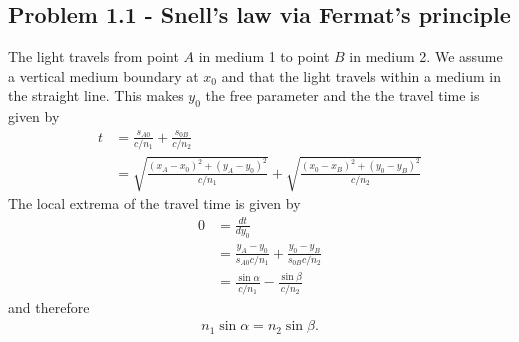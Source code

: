 \documentclass[10pt,a4paper]{book}
\theoremstyle{definition}
\begin{document}
\subsection{Problem 1.1 - Snell's law via Fermat's principle}
The light travels from point $A$ in medium 1 to point $B$ in medium 2. We assume a vertical medium boundary at $x_0$ and that the light travels within a medium in the straight line. This makes $y_0$ the free parameter and the the travel time is given by
\begin{align}
    t&=\frac{s_{A0}}{c/n_1}+\frac{s_{0B}}{c/n_2}\\
    &=\sqrt{\frac{(x_A-x_0)^2+(y_A-y_0)^2}{c/n_1}}+\sqrt{\frac{(x_0-x_B)^2+(y_0-y_B)^2}{c/n_2}}
\end{align}
The local extrema of the travel time is given by
\begin{align}
    0&=\frac{dt}{dy_0}\\
    &=\frac{y_A-y_0}{s_{A0}c/n_1}+\frac{y_0-y_B}{s_{0B}c/n_2}\\
    &=\frac{\sin\alpha}{c/n_1}-\frac{\sin\beta}{c/n_2}
\end{align}
and therefore
\begin{align}
n_1\sin\alpha=n_2\sin\beta.
\end{align}
\end{document}
